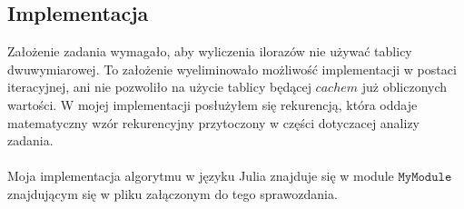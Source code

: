 \subsection{Implementacja}
Założenie zadania wymagało, aby wyliczenia ilorazów nie używać tablicy dwuwymiarowej. To założenie wyeliminowało możliwość implementacji w postaci iteracyjnej, ani nie pozwoliło na użycie tablicy będącej $ cachem $ już obliczonych wartości. W mojej implementacji posłużyłem się rekurencją, która oddaje matematyczny wzór rekurencyjny przytoczony w części dotyczacej analizy zadania. \\\\
Moja implementacja algorytmu w języku Julia znajduje się w module $ \texttt{MyModule} $ znajdującym się w pliku załączonym do tego sprawozdania. 